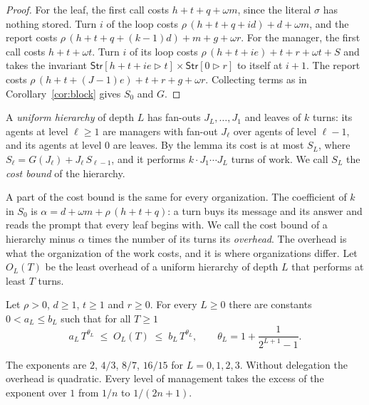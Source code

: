 \documentclass[acmsmall,nonacm,screen]{acmart}
\newcommand{\kw}[1]{\mathsf{#1}}
\newcommand{\Str}[2]{\kw{Str}[#1 \triangleright #2]}
\begin{document}
\begin{proof}
For the leaf, the first call costs $h + t + q + \omega m$, since the literal $\sigma$ has
nothing stored. Turn $i$ of the loop costs $\rho\,(h + t + q + id) + d + \omega m$, and the
report costs $\rho\,(h + t + q + (k-1)d) + m + g + \omega r$. For the manager, the first call
costs $h + t + \omega t$. Turn $i$ of its loop costs
$\rho\,(h + t + ie) + t + r + \omega t + S$ and takes the invariant
$\Str{h + t + ie}{t} \times \Str{0}{r}$ to itself at $i + 1$. The report costs
$\rho\,(h + t + (J-1)e) + t + r + g + \omega r$. Collecting terms as in
Corollary~\ref{cor:block} gives $S_0$ and $G$.
\end{proof}

A \emph{uniform hierarchy} of depth $L$ has fan-outs $J_L, \ldots, J_1$ and leaves of $k$
turns: its agents at level $\ell \ge 1$ are managers with fan-out $J_\ell$ over agents of
level $\ell - 1$, and its agents at level $0$ are leaves. By the lemma its cost is at most
$S_L$, where $S_\ell = G(J_\ell) + J_\ell\,S_{\ell-1}$, and it performs
$k \cdot J_1 \cdots J_L$ turns of work. We call $S_L$ the \emph{cost bound} of the
hierarchy.

A part of the cost bound is the same for every organization. The coefficient of $k$ in $S_0$
is $\alpha = d + \omega m + \rho\,(h + t + q)$: a turn buys its message and its answer and
reads the prompt that every leaf begins with. We call the cost bound of a hierarchy minus
$\alpha$ times the number of its turns its \emph{overhead}. The overhead is what the organization of the
work costs, and it is where organizations differ. Let $O_L(T)$ be the least overhead of a
uniform hierarchy of depth $L$ that performs at least $T$ turns.

\begin{theorem}[Delegation]
\label{thm:delegation}
Let $\rho > 0$, $d \ge 1$, $t \ge 1$ and $r \ge 0$. For every $L \ge 0$ there are constants
$0 < a_L \le b_L$ such that for all $T \ge 1$
\[
a_L\,T^{\theta_L} \;\le\; O_L(T) \;\le\; b_L\,T^{\theta_L},
\qquad \theta_L = 1 + \frac{1}{2^{L+1} - 1} .
\]
\end{theorem}

The exponents are $2$, $4/3$, $8/7$, $16/15$ for $L = 0, 1, 2, 3$. Without delegation the
overhead is quadratic. Every level of management takes the excess of the exponent over $1$
from $1/n$ to $1/(2n+1)$.
\end{document}
